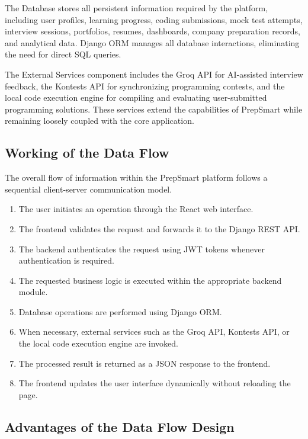 The Database stores all persistent information required by the platform, including user profiles, learning progress, coding submissions, mock test attempts, interview sessions, portfolios, resumes, dashboards, company preparation records, and analytical data. Django ORM manages all database interactions, eliminating the need for direct SQL queries.

The External Services component includes the Groq API for AI-assisted interview feedback, the Kontests API for synchronizing programming contests, and the local code execution engine for compiling and evaluating user-submitted programming solutions. These services extend the capabilities of PrepSmart while remaining loosely coupled with the core application.

\subsection{Working of the Data Flow}

The overall flow of information within the PrepSmart platform follows a sequential client-server communication model.

\begin{enumerate}
    \item The user initiates an operation through the React web interface.
    \item The frontend validates the request and forwards it to the Django REST API.
    \item The backend authenticates the request using JWT tokens whenever authentication is required.
    \item The requested business logic is executed within the appropriate backend module.
    \item Database operations are performed using Django ORM.
    \item When necessary, external services such as the Groq API, Kontests API, or the local code execution engine are invoked.
    \item The processed result is returned as a JSON response to the frontend.
    \item The frontend updates the user interface dynamically without reloading the page.
\end{enumerate}

\subsection{Advantages of the Data Flow Design}

